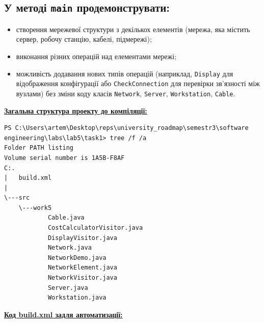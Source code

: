 \documentclass[12pt,a4paper]{article}
\begin{document}
    \subsection*{У методі \texttt{main} продемонструвати:}

    \begin{itemize}
        \item створення мережевої структури з декількох елементів (мережа, яка містить сервер, робочу станцію, кабелі, підмережі);
        \item виконання різних операцій над елементами мережі;
        \item можливість додавання нових типів операцій (наприклад, \texttt{Display} для відображення конфігурації або \texttt{CheckConnection} для перевірки зв'язності між вузлами) без зміни коду класів \texttt{Network}, \texttt{Server}, \texttt{Workstation}, \texttt{Cable}.
    \end{itemize}

    \setlength{\parindent}{0em}

    \textbf{\underline{Загальна структура проекту до компіляції:}}

    \begin{verbatim}
PS C:\Users\artem\Desktop\reps\university_roadmap\semestr3\software engineering\labs\lab5\task1> tree /f /a
Folder PATH listing
Volume serial number is 1A5B-F8AF
C:.
|   build.xml
|   
\---src
    \---work5
            Cable.java
            CostCalculatorVisitor.java
            DisplayVisitor.java
            Network.java
            NetworkDemo.java
            NetworkElement.java
            NetworkVisitor.java
            Server.java
            Workstation.java
    \end{verbatim}

    \textbf{\underline{Код build.xml задля автоматизації:}}
\end{document}
